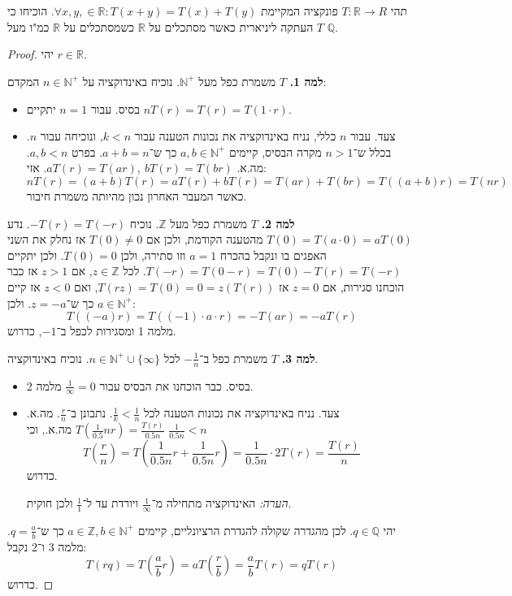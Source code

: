 \documentclass[]{article}
\newcommand\N     {\mathbb{N}}
\newcommand\Z     {\mathbb{Z}}
\newcommand\R     {\mathbb{R}}
\newcommand\Q     {\mathbb{Q}}
\renewcommand\inf {\infty}
\newcommand\co        {\colon}
\newcommand\cl [1]    {\left ( #1 \right )}
\begin{document}
	\section{}
	תהי $T \co \R\to R$ פונקציה המקיימת $\forall x, y,  \in \R\co T(x + y) = T(x)  +T(y)$. הוכיחו כי $T$ העתקה ליניארית כאשר מסתכלים על $\R$ כשמסתכלים על $\R$ כמ"ו מעל $\Q$. 
	\begin{proof} יהי $r \in \R$. 
		
		\textbf{למה 1. }$T$ משמרת כפל מעל $\N^+$. נוכיח באינדוקציה על $n \in \N^+$ המקדם: 
		\begin{itemize}
			\item בסיס. עבור $n = 1$ יתקיים $nT(r) = T(r) = T(1 \cdot r)$. 
			\item צעד. עבור $n$ כללי, נניח באינדוקציה את נכונות הטענה עבור $k < n$, ונוכיחה עבור $n$. בכלל ש־$n > 1$ מקרה הבסיס, קיימים $a, b \in \N^+$ כך ש־$a + b = n$. בפרט $a, b < n$. מה.א. $aT(r) = T(ar), \ bT(r) = T(br)$. 
			אזי: 
			\[ nT(r) = (a + b)T(r) = aT(r) + bT(r) = T(ar) + T(br) = T((a + b)r) = T(nr) \]
			כאשר המעבר האחרון נכון מהיותה משמרת חיבור. 
		\end{itemize}
		
		\textbf{למה 2. }$T$ משמרת כפל מעל $\Z$. נוכיח $-T(r) = T(-r)$. נדע $T(0) = T(a \cdot 0) = aT(0)$ מהטענה הקודמת, ולכן אם $T(0) \neq 0$ אז נחלק את השני האפגים בו ונקבל בהכרח $a = 1$ וזו סתירה, ולכן $T(0) = 0$. ולכן 		
		יתקיים $T(-r) = T(0 - r) = T(0) - T(r) = T(-r)$. לכל $z \in \Z$, אם $z > 1$ אז כבר הוכחנו סגירות, אם $z = 0$ אז $T(rz) = T(0) = 0 = z(T(r))$, ואם $z < 0$ אז קיים $a \in \N^+$ כך ש־$z = -a$. ולכן: 
		\[ T((-a)r) = T((-1) \cdot a \cdot r) = -T(ar) = -aT(r) \]
		מלמה 1 ומסגירות לכפל ב־$-1$, כדרוש. 
		
		\textbf{למה 3. }$T$ משמרת כפל ב־$-\frac{1}{n}$ לכל $n \in \N^+ \cup \{\inf\}$. נוכיח באינדוקציה. 
		\begin{itemize}
			\item בסיס. כבר הוכחנו את הבסיס עבור $\frac{1}{\inf} = 0$ מלמה 2. 
			\item צעד. נניח באינדוקציה את נכונות הטענה לכל $\frac{1}{k} < \frac{1}{n}$. נתבונן ב־$\frac{r}{n}$. מה.א. $T\cl{\frac{1}{0.5}n r} = \frac{T(r)}{0.5n}$ מה.א., וכי $\frac{1}{0.5n} < n$
			\[ T\cl{\frac{r}{n}} = T\cl{\frac{1}{0.5n}r + \frac{1}{0.5n}r} = \frac{1}{0.5n} \cdot 2T\cl{r} = \frac{T(r)}{n} \]
			כדרוש. 
			
			\textit{הערה: }האינדוקציה מתחילה מ־$\frac{1}{\inf}$ ויורדת עד ל־$\frac{1}{1}$ ולכן חוקית. 
		\end{itemize}
		
		יהי $q \in \Q$. לכן מהגדרה שקולה להגדרת הרציונליים, קיימים $a \in \Z, b \in \N^+$ כך ש־$q = \frac{a}{b}$. 
		מלמה 3 ו־2 נקבל: 
		\[ T(rq) = T\cl{\frac{a}{b}r} = aT\cl{\frac{r}{b}} = \frac{a}{b}T(r) = qT(r) \]
		כדרוש. 
	\end{proof}
\end{document}
